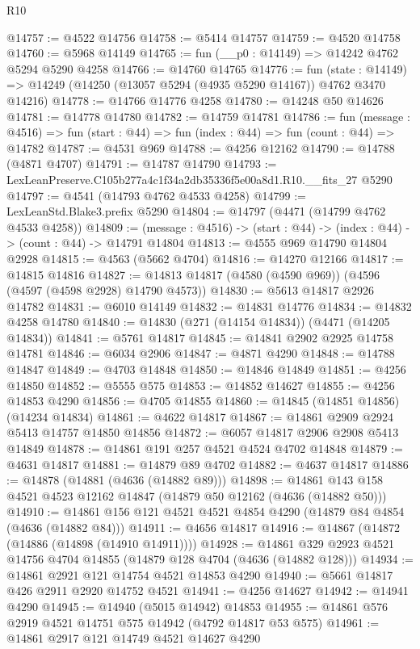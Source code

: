 \begin{lexlean}{R10}
\begin{coremodule}
@14757 := @4522 @14756
@14758 := @5414 @14757
@14759 := @4520 @14758
@14760 := @5968 @14149
@14765 := fun (__p0 : @14149) => @14242 @4762 @5294 @5290 @4258
@14766 := @14760 @14765
@14776 := fun (state : @14149) =>
  @14249 (@14250 (@13057 @5294 (@4935 @5290 @14167)) @4762 @3470 @14216)
@14778 := @14766 @14776 @4258
@14780 := @14248 @50 @14626
@14781 := @14778 @14780
@14782 := @14759 @14781
@14786 := fun (message : @4516) =>
  fun (start : @44) => fun (index : @44) => fun (count : @44) => @14782
@14787 := @4531 @969
@14788 := @4256 @12162
@14790 := @14788 (@4871 @4707)
@14791 := @14787 @14790
@14793 := LexLeanPreserve.C105b277a4c1f34a2db35336f5e00a8d1.R10.__fits_27 @5290
@14797 := @4541 (@14793 @4762 @4533 @4258)
@14799 := LexLeanStd.Blake3.prefix @5290
@14804 := @14797 (@4471 (@14799 @4762 @4533 @4258))
@14809 := (message : @4516) -> (start : @44) -> (index : @44) -> (count : @44) -> @14791 @14804
@14813 := @4555 @969 @14790 @14804 @2928
@14815 := @4563 (@5662 @4704)
@14816 := @14270 @12166
@14817 := @14815 @14816
@14827 := @14813 @14817 (@4580 (@4590 @969)) (@4596 (@4597 (@4598 @2928) @14790 @4573))
@14830 := @5613 @14817 @2926 @14782
@14831 := @6010 @14149
@14832 := @14831 @14776
@14834 := @14832 @4258 @14780
@14840 := @14830 (@271 (@14154 @14834)) (@4471 (@14205 @14834))
@14841 := @5761 @14817
@14845 := @14841 @2902 @2925 @14758 @14781
@14846 := @6034 @2906
@14847 := @4871 @4290
@14848 := @14788 @14847
@14849 := @4703 @14848
@14850 := @14846 @14849
@14851 := @4256 @14850
@14852 := @5555 @575
@14853 := @14852 @14627
@14855 := @4256 @14853 @4290
@14856 := @4705 @14855
@14860 := @14845 (@14851 @14856) (@14234 @14834)
@14861 := @4622 @14817
@14867 := @14861 @2909 @2924 @5413 @14757 @14850 @14856
@14872 := @6057 @14817 @2906 @2908 @5413 @14849
@14878 := @14861 @191 @257 @4521 @4524 @4702 @14848
@14879 := @4631 @14817
@14881 := @14879 @89 @4702
@14882 := @4637 @14817
@14886 := @14878 (@14881 (@4636 (@14882 @89)))
@14898 := @14861 @143 @158 @4521 @4523 @12162 @14847 (@14879 @50 @12162 (@4636 (@14882 @50)))
@14910 := @14861 @156 @121 @4521 @4521 @4854 @4290 (@14879 @84 @4854 (@4636 (@14882 @84)))
@14911 := @4656 @14817
@14916 := @14867 (@14872 (@14886 (@14898 (@14910 @14911))))
@14928 := @14861 @329 @2923 @4521 @14756 @4704 @14855 (@14879 @128 @4704 (@4636 (@14882 @128)))
@14934 := @14861 @2921 @121 @14754 @4521 @14853 @4290
@14940 := @5661 @14817 @426 @2911 @2920 @14752 @4521
@14941 := @4256 @14627
@14942 := @14941 @4290
@14945 := @14940 (@5015 @14942) @14853
@14955 := @14861 @576 @2919 @4521 @14751 @575 @14942 (@4792 @14817 @53 @575)
@14961 := @14861 @2917 @121 @14749 @4521 @14627 @4290

\end{coremodule}
\end{lexlean}

